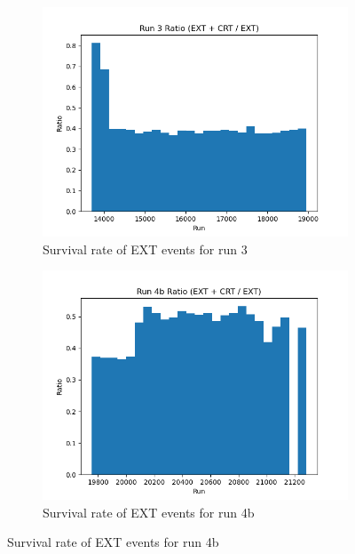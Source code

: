 \begin{figure}[H]
 \centering
    \begin{subfigure}[t]{0.3\linewidth}
        \includegraphics[width=\linewidth]{technote/EventSelections/FiguresCRT/run3_rationew.png}
        \caption{Survival rate of EXT events for run 3}
    \end{subfigure}%
    \hspace{0.3cm}%
    \begin{subfigure}[t]{0.3\linewidth}
        \includegraphics[width=\linewidth]{technote/EventSelections/FiguresCRT/run4b_ratio1.png}%
        \caption{Survival rate of EXT events for run 4b}
    \end{subfigure}%
    \hspace{0.3cm}%

\end{figure}
